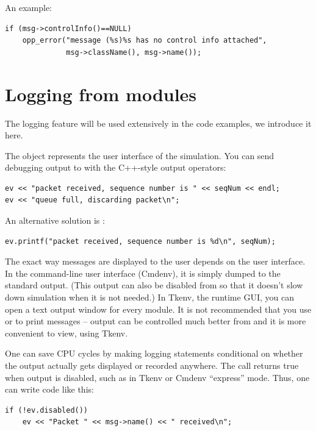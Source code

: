 An example:

\begin{verbatim}
if (msg->controlInfo()==NULL)
    opp_error("message (%s)%s has no control info attached",
              msg->className(), msg->name());
\end{verbatim}



\section{Logging from modules}

The logging feature will be used extensively in the code examples,
we introduce it here.

The  object represents the user interface of the
simulation.  You can send debugging output to  with the C++-style
output operators:

\begin{verbatim}
ev << "packet received, sequence number is " << seqNum << endl;
ev << "queue full, discarding packet\n";
\end{verbatim}

An alternative solution is :

\begin{verbatim}
ev.printf("packet received, sequence number is %d\n", seqNum);
\end{verbatim}

The exact way messages are displayed to the user depends on the user
interface. In the command-line user interface (Cmdenv),
it is simply dumped to the standard output. (This output can also be
disabled from  so that it doesn't slow down simulation
when it is not needed.) In Tkenv, the runtime GUI, you can open
a text output window for every module.
It is not recommended that you use  or 
to print messages --  output can be controlled much better
from  and it is more convenient to view, using Tkenv.

One can save CPU cycles by making logging statements conditional
on whether the output actually gets displayed or recorded anywhere.
The  call returns true when  output is disabled,
such as in Tkenv or Cmdenv ``express'' mode. Thus, one can write code like
this:

\begin{verbatim}
if (!ev.disabled())
    ev << "Packet " << msg->name() << " received\n";
\end{verbatim}

